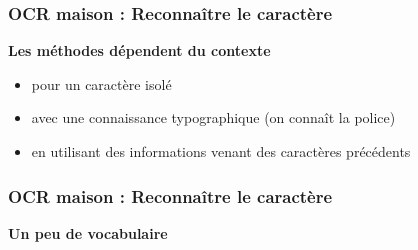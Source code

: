 \documentclass[xcolor=dvipsnames]{beamer}
\begin{document}
\begin{frame}
\frametitle{OCR maison : Reconnaître le caractère }
      \begin{alertblock}{}
            \begin{center}
                  \textbf{\Large Les méthodes dépendent du contexte}
            \end{center}
            \begin{itemize}
            \item pour un caractère isolé
            \item avec une connaissance typographique (on connaît la police)
            \item en utilisant des informations venant des caractères précédents
            \end{itemize}
      \end{alertblock}
\end{frame}


\begin{frame}
\frametitle{OCR maison : Reconnaître le caractère }
       
      \begin{alertblock}{}
            \begin{center}
                  \textbf{\Large Un peu de vocabulaire}
            \end{center}
      \end{alertblock}
\end{frame}
\end{document}
